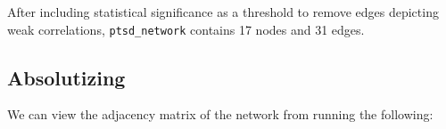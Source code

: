\documentclass[
]{book}
\newenvironment{Shaded}{\begin{snugshade}}{\end{snugshade}}
\newcommand{\NormalTok}[1]{#1}
\newcommand{\SpecialCharTok}[1]{\textcolor[rgb]{0.81,0.36,0.00}{\textbf{#1}}}
\begin{document}
After including statistical significance as a threshold to remove edges depicting weak correlations, \texttt{ptsd\_network} contains 17 nodes and 31 edges.

\subsection{Absolutizing}\label{absolutizing}

We can view the adjacency matrix of the network from running the following:

\begin{Shaded}
\end{Shaded}
\end{document}
